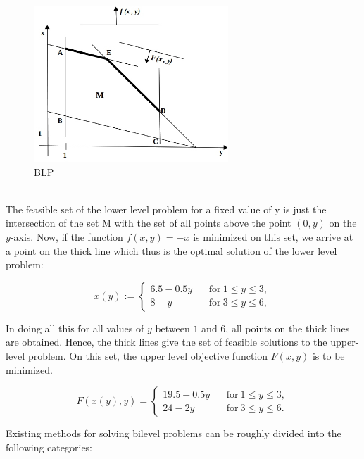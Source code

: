 \documentclass[a4paper, 12pt]{article}
\begin{document}
\begin{figure}[h]
\centering
\includegraphics[width=0.65\textwidth, clip]{./blp.jpg}
\vspace{-0.15in}
\caption{BLP}
\label{fig:2}
\end{figure}
\noindent
\\
The feasible set of the lower level problem for a fixed value of y is just the intersection of the set M with the set of all points above the point $\left(0,y\right)$ on the $y$-axis. Now, if the function $f \left(x,y\right) = -x$ is minimized on this set, we arrive at a point on the thick line which thus is the optimal solution of the lower level problem:\\
\begin{large}
\[
 x(y) := 
  \begin{cases} 
   6.5-0.5y\ \ \ \ &\text{for}\ 1\leq{y}\leq3,\\
   8-y\ \ \ \ &\text{for}\ 3\leq{y}\leq6,
  \end{cases}
\]
\end{large}
\noindent
In doing all this for all values of $y$ between $1$ and $6$, all points on the thick lines are obtained. Hence, the thick lines give the set of feasible solutions to the upper-level problem. On this set, the upper level objective function $F\left(x,y\right)$ is to be minimized.
\begin{large}
\[
 F(x(y),y) = 
  \begin{cases}
   19.5-0.5y\ \ \ \ &\text{for}\ 1\leq{y}\leq3,\\
   24-2y\ \ \ \ &\text{for}\ 3\leq{y}\leq{6}.
  \end{cases}
\]
\end{large}
\noindent
Existing methods for solving bilevel problems can be roughly divided into the following categories:
\end{document}
